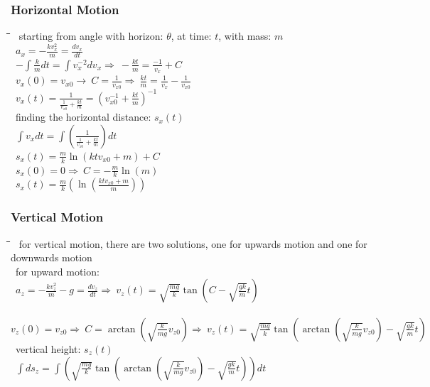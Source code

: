 \documentclass[10pt,letterpaper]{scrartcl}
\newcommand{\tbul}{\textbullet}
\newcommand{\tend}{\>\textendash}
\newcommand{\tabDef}{\hspace{2em}\=\hspace{2em}\=\hspace{2em}\=\hspace{2em}\=\kill}
\begin{document}
\subsubsection*{Horizontal Motion}\begin{tabbing}\tabDef
\tbul\ starting from angle with horizon: $\theta$, at time: $t$, with mass: $m$\\
    \>\>\ $\displaystyle a_x = -\frac{kv^2_x}{m} = \frac{dv_x}{dt}$ \\
    \>\>\ $\displaystyle -\int\frac{k}{m}dt = \int v^{-2}_xdv_x\Rightarrow\ -\frac{kt}{m}=\frac{-1}{v_x}+C$\\ 
    \>\>\ $\displaystyle v_x(0) = v_{x0}\rightarrow\ C = \frac{1}{v_{x0}}\Rightarrow\ \frac{kt}{m} = \frac{1}{v_x} - \frac{1}{v_{x0}}$\\
    \>\>\ $\displaystyle v_x(t) = \frac{1}{\frac{1}{v_{x0}} + \frac{kt}{m}} = (v^{-1}_{x0} + \frac{kt}{m})^{-1}$ \\
\tbul\ finding the horizontal distance: $s_x(t)$\\
    \>\>\ $\displaystyle \int v_xdt = \int (\frac{1}{\frac{1}{v_{x0}} + \frac{kt}{m}})dt$ \\
    \>\>\ $\displaystyle s_x(t) = \frac{m}{k}\ln(ktv_{x0}+m)+C$ \\
    \>\>\ $\displaystyle s_x(0) = 0\Rightarrow\ C = -\frac{m}{k}\ln(m)$ \\
    \>\>\ $\displaystyle s_x(t) = \frac{m}{k}(\ln(\frac{ktv_{x0} + m}{m}))$\end{tabbing}
\subsubsection*{Vertical Motion}\begin{tabbing}\tabDef
\tbul\ for vertical motion, there are two solutions, one for upwards motion and one for downwards motion \\
\tbul\ for upward motion: \\
    \>\>\ $\displaystyle a_z = -\frac{kv^2_z}{m} - g = \frac{dv_z}{dt}\Rightarrow\ v_z(t) = \sqrt{\frac{mg}{k}}\tan(C - \sqrt{\frac{gk}{m}}t)$ \\
    \>\>\ $\displaystyle v_z(0) = v_{z0}\Rightarrow\ C = \arctan(\sqrt{\frac{k}{mg}}v_{z0})\Rightarrow\ v_z(t) = \sqrt{\frac{mg}{k}}\tan(\arctan(\sqrt{\frac{k}{mg}}v_{z0})-\sqrt{\frac{gk}{m}}t)$\\
    \tend\ vertical height: $s_z(t)$ \\
    \>\>\ $\displaystyle \int ds_z = \int (\sqrt{\frac{mg}{k}}\tan(\arctan(\sqrt{\frac{k}{mg}}v_{z0})-\sqrt{\frac{gk}{m}}t))dt$\\
\end{tabbing}
\end{document}
